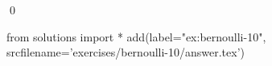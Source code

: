 
\begin{ex} 
  \label{ex:bernoulli-10}
  
  \qed
\end{ex} 
\begin{python0}
from solutions import *
add(label="ex:bernoulli-10",
    srcfilename='exercises/bernoulli-10/answer.tex') 
\end{python0}
